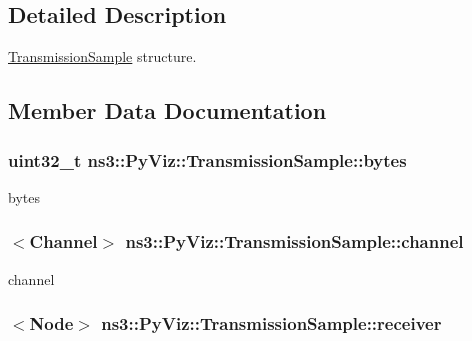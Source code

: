 \subsection{Detailed Description}
\hyperlink{structns3_1_1PyViz_1_1TransmissionSample}{Transmission\+Sample} structure. 

\subsection{Member Data Documentation}
\subsubsection[{\texorpdfstring{bytes}{bytes}}]{\setlength{\rightskip}{0pt plus 5cm}uint32\+\_\+t ns3\+::\+Py\+Viz\+::\+Transmission\+Sample\+::bytes}\hypertarget{structns3_1_1PyViz_1_1TransmissionSample_a273f8213a60d9fefb91ded7a474d1b6e}{}\label{structns3_1_1PyViz_1_1TransmissionSample_a273f8213a60d9fefb91ded7a474d1b6e}


bytes 

\subsubsection[{\texorpdfstring{channel}{channel}}]{$<${\bf Channel}$>$ ns3\+::\+Py\+Viz\+::\+Transmission\+Sample\+::channel}\hypertarget{structns3_1_1PyViz_1_1TransmissionSample_abe66e9e5905aaf85f4a04c69eb87b167}{}\label{structns3_1_1PyViz_1_1TransmissionSample_abe66e9e5905aaf85f4a04c69eb87b167}


channel 

\subsubsection[{\texorpdfstring{receiver}{receiver}}]{$<${\bf Node}$>$ ns3\+::\+Py\+Viz\+::\+Transmission\+Sample\+::receiver}\hypertarget{structns3_1_1PyViz_1_1TransmissionSample_ad27e64165d1154bdf44f36e9f5adb758}{}\label{structns3_1_1PyViz_1_1TransmissionSample_ad27e64165d1154bdf44f36e9f5adb758}


